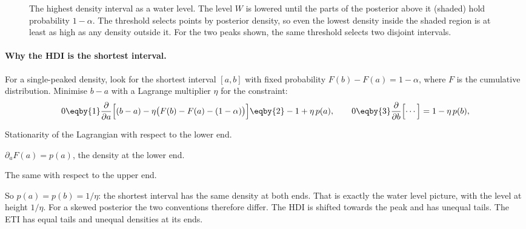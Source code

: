 \begin{figure}[htbp]
\centering
{}
\caption{The highest density interval as a water level. The level $W$ is lowered until
the parts of the posterior above it (shaded) hold probability $1-\alpha$. The threshold selects points by posterior density, so even the lowest density inside the shaded region is at least as high as any density outside it. For the two peaks shown, the same threshold selects two disjoint intervals.}
\label{5b:fig:hdi-water}
\end{figure}

\paragraph{Why the HDI is the shortest interval.}
For a single-peaked density, look for the shortest interval $[a,b]$ with fixed
probability $F(b)-F(a)=1-\alpha$, where $F$ is the cumulative distribution. Minimise
$b-a$ with a Lagrange multiplier $\eta$ for the constraint:
\begin{align*}
  0\eqby{1}\frac{\partial}{\partial a}\Bigl[(b-a)-\eta\bigl(F(b)-F(a)-(1-\alpha)\bigr)\Bigr]
  \eqby{2}-1+\eta\,p(a),\qquad
  0\eqby{3}\frac{\partial}{\partial b}\Bigl[\cdots\Bigr]=1-\eta\,p(b),
\end{align*}
\begin{explain}
  \item Stationarity of the Lagrangian with respect to the lower end.
  \item $\partial_aF(a)=p(a)$, the density at the lower end.
  \item The same with respect to the upper end.
\end{explain}
So $p(a)=p(b)=1/\eta$: the shortest interval has the same density at both ends. That
is exactly the water level picture, with the level at height $1/\eta$. For a skewed
posterior the two conventions therefore differ. The HDI is shifted towards the peak and
has unequal tails. The ETI has equal tails and unequal densities at its ends.


